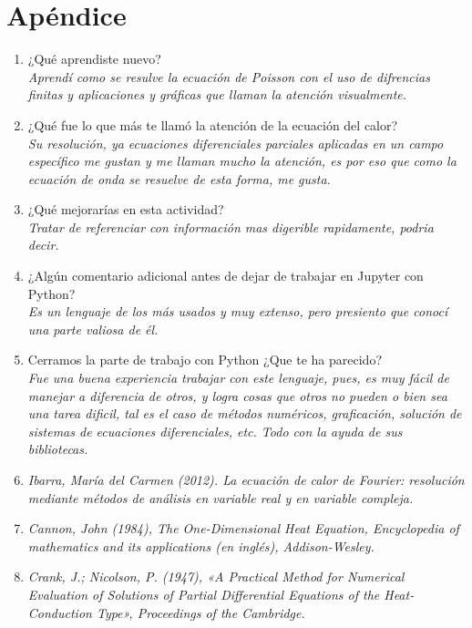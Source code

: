 \documentclass[12pt]{article}
\begin{document}
\section*{Apéndice}
\begin{enumerate}

\item ¿Qué aprendiste nuevo?\\
\textit{Aprendí como se resulve la ecuación de Poisson con el uso de difrencias finitas y aplicaciones y gráficas que llaman la atención visualmente.}

\item ¿Qué fue lo que más te llamó la atención de la ecuación del calor?\\
\textit{Su resolución, ya ecuaciones diferenciales parciales aplicadas en un campo específico me gustan y me llaman mucho la atención, es por eso que como la ecuación de onda se resuelve de esta forma, me gusta.}

\item ¿Qué mejorarías en esta actividad?\\
\textit{Tratar de referenciar con información mas digerible rapidamente, podria decir.}

\item ¿Algún comentario adicional antes de dejar de trabajar en Jupyter con Python?\\
\textit{Es un lenguaje de los más usados y muy extenso, pero presiento que conocí una parte valiosa de él.}

\item Cerramos la parte de trabajo con Python ¿Que te ha parecido?\\
\textit{Fue una buena experiencia trabajar con este lenguaje, pues, es muy fácil de manejar a diferencia de otros, y logra cosas que otros no pueden o bien sea una tarea dificil, tal es el caso de métodos numéricos, graficación, solución de sistemas de ecuaciones diferenciales, etc. Todo con la ayuda de sus bibliotecas.}

\item \textit{Ibarra, María del Carmen (2012). La ecuación de calor de Fourier: resolución mediante métodos de análisis en variable real y en variable compleja.}

\item \textit{Cannon, John (1984), The One-Dimensional Heat Equation, Encyclopedia of mathematics and its applications (en inglés), Addison-Wesley.}

\item \textit{Crank, J.; Nicolson, P. (1947), «A Practical Method for Numerical Evaluation of Solutions of Partial Differential Equations of the Heat-Conduction Type», Proceedings of the Cambridge.}


\end{enumerate}
\end{document}

